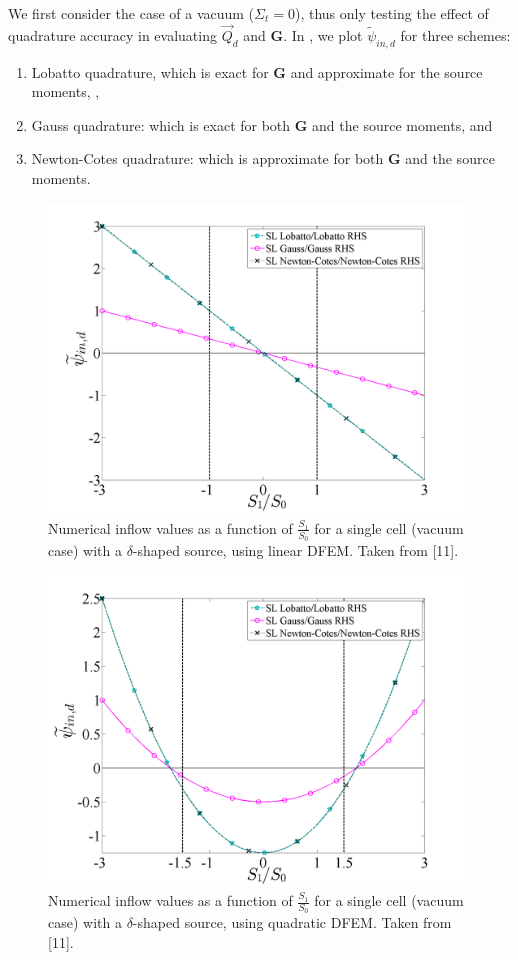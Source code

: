 We first consider the case of a vacuum ($\Sigma_t=0$), thus only testing the effect of quadrature accuracy in evaluating $\vec{Q}_d$ and $\mathbf{G}$.  
In , we plot $\widetilde{\psi}_{in,d}$ for three schemes:
\begin{enumerate}
\item Lobatto quadrature, which is exact for $\mathbf{G}$ and approximate for the source moments,  ,
\item Gauss quadrature: which is exact for both $\mathbf{G}$ and the source moments, and 
\item Newton-Cotes quadrature: which is approximate for both $\mathbf{G}$ and the source moments.
\end{enumerate}
\begin{figure}[!hbp]
\centering
\includegraphics[width=11cm]{chapter2_constant_xs/Final_Inflow_RHS_Comparison_Source_P1_MFP_0.png}
\caption{Numerical inflow values as a function of $\frac{S_1}{S_0}$ for a single cell (vacuum case) with a $\delta$-shaped source, using linear DFEM.  Taken from [11].}
\label{fig:vac_inflow_p1}
\end{figure}
\begin{figure}[!htp]
\centering
\includegraphics[width=11cm]{chapter2_constant_xs/Final_Inflow_RHS_Comparison_Source_P2_MFP_0.png}
\caption{Numerical inflow values as a function of $\frac{S_1}{S_0}$ for a single cell (vacuum case) with a $\delta$-shaped source, using quadratic DFEM.  Taken from [11].}
\label{fig:vac_inflow_p2}
\end{figure}
